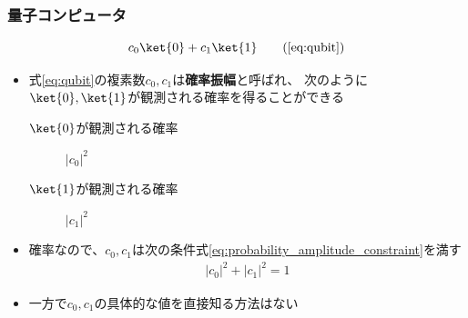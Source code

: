\begin{frame}
  \frametitle{量子コンピュータ}

  \[
    c_0\ket{0} + c_1\ket{1} \tag{\ref{eq:qubit}}
  \]
  \begin{itemize}
    \item<+-> 式\ref{eq:qubit}の複素数$c_0, c_1$は\textbf{確率振幅}と呼ばれ、
    次のように$\ket{0}, \ket{1}$が観測される確率を得ることができる
    \begin{description}
      \item[$\ket{0}$が観測される確率] $|c_0|^2$
      \item[$\ket{1}$が観測される確率] $|c_1|^2$
    \end{description}

    \item<+-> 確率なので、$c_0, c_1$は次の条件式\ref{eq:probability_amplitude_constraint}を満す
    \begin{align}
      |c_0|^2 + |c_1|^2 = 1 \label{eq:probability_amplitude_constraint}
    \end{align}

    \item<+-> 一方で$c_0, c_1$の具体的な値を直接知る方法はない
  \end{itemize}
\end{frame}

